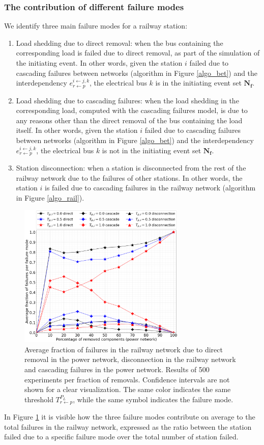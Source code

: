 \documentclass[review]{elsarticle}
\begin{document}
\subsubsection{The contribution of different failure modes}
We identify three main failure modes for a railway station:
\begin{enumerate}
	\item Load shedding due to direct removal: when the bus containing the corresponding load is failed due to direct removal, as part of the simulation of the initiating event. In other words, given the station $i$ failed due to cascading failures between networks (algorithm in Figure \ref{algo_bet}) and the interdependency $e^{i \leftarrow j,k}_{r\leftarrow p}$, the electrical bus $k$ is in the initiating event set $\mathbf{N_f}$.
	\item Load shedding due to cascading failures: when the load shedding in the corresponding load, computed with the cascading failures model, is due to any reasons other than the direct removal of the bus containing the load itself. In other words, given the station $i$ failed due to cascading failures between networks (algorithm in Figure \ref{algo_bet}) and the interdependency $e^{i \leftarrow j,k}_{r\leftarrow p}$, the electrical bus $k$ is not in the initiating event set $\mathbf{N_f}$.
	\item Station disconnection: when a station is disconnected from the rest of the railway network due to the failures of other stations. In other words, the station $i$ is failed due to cascading failures in the railway network (algorithm in Figure \ref{algo_rail}).
\end{enumerate}
		\begin{figure}[h]
	\centering
	\includegraphics[width=8cm]{images/perc_fail_power_to_rail.png}
	\caption{Average fraction of failures in the railway network due to direct removal in the power network, disconnection in the railway network and cascading failures in the power network. Results of 500 experiments per fraction of removals. Confidence intervals are not shown for a clear visualization. The same color indicates the same threshold $T_{r \leftarrow p}^{P_L}$, while the same symbol indicates the failure mode.}
	\label{perc_fail_power_to_rail}
\end{figure}
In Figure \ref{perc_fail_power_to_rail} it is visible how the three failure modes contribute on average to the total failures in the railway network, expressed as the ratio between the station failed due to a specific failure mode over the total number of station failed.
\end{document}
